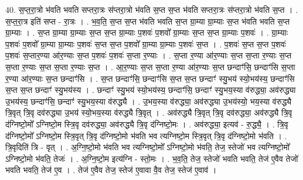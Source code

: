 \documentclass[17pt]{extarticle}
\begin{document}
40. स॒प्त॒रा॒त्रो भ॑वति भवति सप्तरा॒त्रः स॑प्तरा॒त्रो भ॑वति स॒प्त स॒प्त भ॑वति सप्तरा॒त्रः स॑प्तरा॒त्रो भ॑वति स॒प्त । . स॒प्त॒रा॒त्र इति॑ सप्त - रा॒त्रः । . भ॒व॒ति॒ स॒प्त स॒प्त भ॑वति भवति स॒प्त ग्रा॒म्या ग्रा॒म्याः स॒प्त भ॑वति भवति स॒प्त ग्रा॒म्याः । . स॒प्त ग्रा॒म्या ग्रा॒म्याः स॒प्त स॒प्त ग्रा॒म्याः प॒शवः॑ प॒शवो᳚ ग्रा॒म्याः स॒प्त स॒प्त ग्रा॒म्याः प॒शवः॑ । . ग्रा॒म्याः प॒शवः॑ प॒शवो᳚ ग्रा॒म्या ग्रा॒म्याः प॒शवः॑ स॒प्त स॒प्त प॒शवो᳚ ग्रा॒म्या ग्रा॒म्याः प॒शवः॑ स॒प्त । . प॒शवः॑ स॒प्त स॒प्त प॒शवः॑ प॒शवः॑ स॒प्तार॒ण्या आ॑र॒ण्याः स॒प्त प॒शवः॑ प॒शवः॑ स॒प्ता र॒ण्याः । . स॒प्ता र॒ण्या आ॑र॒ण्याः स॒प्त स॒प्ता र॒ण्याः स॒प्त स॒प्ता र॒ण्याः स॒प्त स॒प्ता र॒ण्याः स॒प्त । . आ॒र॒ण्याः स॒प्त स॒प्ता र॒ण्या आ॑र॒ण्याः स॒प्त छन्दाꣳ॑सि॒ छन्दाꣳ॑सि स॒प्ता र॒ण्या आ॑र॒ण्याः स॒प्त छन्दाꣳ॑सि । . स॒प्त छन्दाꣳ॑सि॒ छन्दाꣳ॑सि स॒प्त स॒प्त छन्दाꣳ॑ स्यु॒भय॑ स्यो॒भय॑स्य॒ छन्दाꣳ॑सि स॒प्त स॒प्त छन्दाꣳ॑ स्यु॒भय॑स्य । . छन्दाꣳ॑ स्यु॒भय॑ स्यो॒भय॑स्य॒ छन्दाꣳ॑सि॒ छन्दाꣳ॑ स्यु॒भय॒स्या व॑रुद्ध्या॒ अव॑रुद्ध्या उ॒भय॑स्य॒ छन्दाꣳ॑सि॒ छन्दाꣳ॑ स्यु॒भय॒स्या व॑रुद्ध्यै । . उ॒भय॒स्या व॑रुद्ध्या॒ अव॑रुद्ध्या उ॒भय॑स्यो॒ भय॒स्या व॑रुद्ध्यै त्रि॒वृत् त्रि॒वृ दव॑रुद्ध्या उ॒भय॑
स्यो॒भय॒स्या व॑रुद्ध्यै त्रि॒वृत् । . अव॑रुद्ध्यै त्रि॒वृत् त्रि॒वृ दव॑रुद्ध्या॒ अव॑रुद्ध्यै त्रि॒वृ द॑ग्निष्टो॒मो᳚ ऽग्निष्टो॒म स्त्रि॒वृ दव॑रुद्ध्या॒ अव॑रुद्ध्यै त्रि॒वृ द॑ग्निष्टो॒मः । . अव॑रुद्ध्या॒ इत्यव॑ - रु॒द्ध्यै॒ । . त्रि॒वृ द॑ग्निष्टो॒मो᳚ ऽग्निष्टो॒म स्त्रि॒वृत् त्रि॒वृ द॑ग्निष्टो॒मो भ॑वति भव त्यग्निष्टो॒म स्त्रि॒वृत् त्रि॒वृ द॑ग्निष्टो॒मो भ॑वति । . त्रि॒वृदिति॑ त्रि - वृत् । . अ॒ग्नि॒ष्टो॒मो भ॑वति भव त्यग्निष्टो॒मो᳚ ऽग्निष्टो॒मो भ॑वति॒ तेज॒ स्तेजो॑ भव त्यग्निष्टो॒मो᳚ ऽग्निष्टो॒मो भ॑वति॒ तेजः॑ । . अ॒ग्नि॒ष्टो॒म इत्य॑ग्नि - स्तो॒मः । . भ॒व॒ति॒ तेज॒ स्तेजो॑ भवति भवति॒ तेज॑ ए॒वैव तेजो॑ भवति भवति॒ तेज॑ ए॒व । . तेज॑ ए॒वैव तेज॒ स्तेज॑ ए॒वावा वै॒व तेज॒ स्तेज॑ ए॒वाव॑ । \newline
\pagebreak
{}
\end{document}
